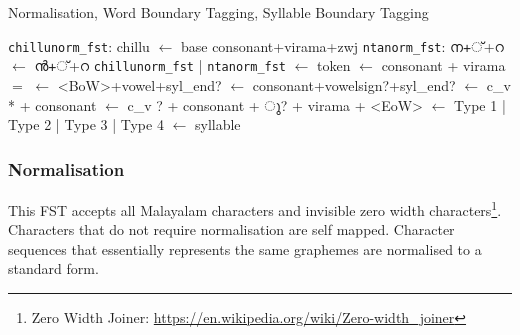 \documentclass{ieeeaccess}
\begin{document}



\begin{algorithm*}
	\caption{Normalisation, Word Boundary Tagging, Syllable Boundary Tagging}\label{syllabifier}
	\begin{algorithmic}[1]
		\State \texttt{chillunorm\_fst}: {\ipa chillu} $\gets$ {\ipa base consonant+virama+zwj} 
		\State \texttt{ntanorm\_fst}: {\mal ന+്+റ} $\gets$ {\mal ൻ+്+റ}
		\State \Return \texttt{chillunorm\_fst} {\ipa  | } \texttt{ntanorm\_fst} 
	\EndProcedure
		\State {} $\gets$ {\ipa token} 
	\EndProcedure
 		 $\gets$ {\ipa consonant + virama}
   		 $=$ {}  
        \State {}
		 $\gets$ {\ipa <BoW>+vowel+syl\_end?}  
		 $\gets$ {\ipa consonant+vowelsign?+syl\_end?}
		 $\gets$ {\ipa c\_v * + consonant} 
		 $\gets$ {\ipa c\_v ? + consonant + {\mal ു}? + virama + <EoW>}
		 $\gets$ {\ipa Type 1 | Type 2 | Type 3 | Type 4 } 
		\State {} $\gets$ {\ipa syllable} 
	\EndProcedure
	\end{algorithmic}
\end{algorithm*}


\subsubsection{Normalisation}
\label{normalisation}

This FST accepts all Malayalam characters and invisible zero width characters\footnote{Zero Width Joiner: \url{https://en.wikipedia.org/wiki/Zero-width_joiner}}. Characters that do not require normalisation are self mapped. Character sequences that essentially represents the same graphemes are normalised to a standard form. 
\end{document}
